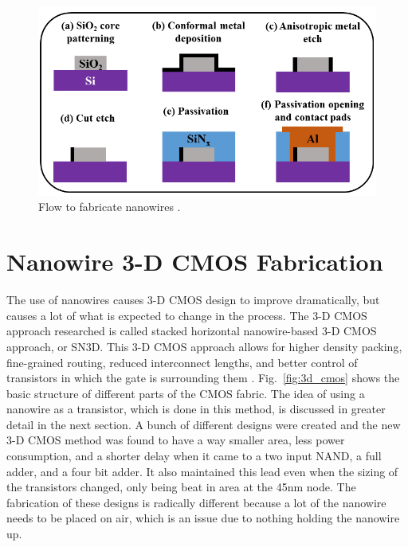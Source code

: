 \documentclass[conference]{IEEEtran}
\begin{document}
\begin{figure}[!htb]
    \centering
    \includegraphics[width=\linewidth]{figures/inter_fab.png}
    \caption{Flow to fabricate nanowires \cite{7968937}.}\label{fig:inter_fab}
\end{figure}

\section{Nanowire 3-D CMOS Fabrication}
The use of nanowires causes 3-D CMOS design to improve dramatically, but causes a lot of what is expected to change in the process.
The 3-D CMOS approach researched is called stacked horizontal nanowire-based 3-D CMOS approach, or SN3D. This 3-D CMOS approach
allows for higher density packing, fine-grained routing, reduced interconnect lengths, and better control of transistors in which
the gate is surrounding them \cite{8387522}. Fig.~\ref{fig:3d_cmos} shows the basic structure of different parts of the CMOS fabric.
The idea of using a nanowire as a transistor, which is done in this method, is discussed in greater detail in the next section.
A bunch of different designs were created and the new 3-D CMOS method was found to have a way smaller area, less power consumption,
and a shorter delay when it came to a two input NAND, a full adder, and a four bit adder. It also maintained this lead even when 
the sizing of the transistors changed, only being beat in area at the 45nm node. 
The fabrication of these designs is radically different because a lot of the nanowire needs to be placed on air, which is an issue
due to nothing holding the nanowire up. 
\end{document}
